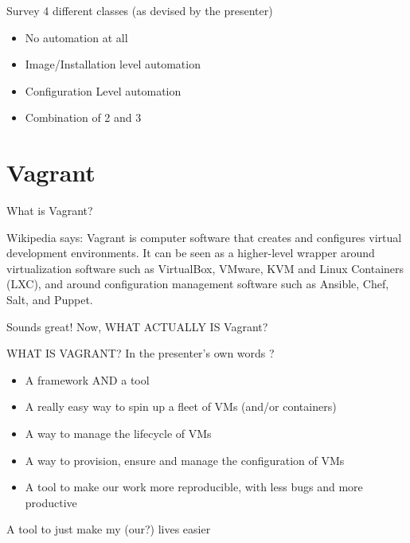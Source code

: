 \documentclass{beamer}
\begin{document}
    \begin{frame}{Survey}
	4 different classes (as devised by the presenter)
        \begin{itemize}
	    \item No automation at all
	    \item Image/Installation level automation
	    \item Configuration Level automation
	    \item Combination of 2 and 3
        \end{itemize}
    \end{frame}

\section{Vagrant}
    \begin{frame}{What is Vagrant?}

    \pause \begin{block}{Wikipedia says:}
		Vagrant is computer software that creates and configures virtual development environments.
		It can be seen as a higher-level wrapper around virtualization software such as VirtualBox,
		VMware, KVM and Linux Containers (LXC), and around configuration management software such as Ansible, Chef, Salt, and Puppet.
    \end{block}

    \pause Sounds great! Now, WHAT ACTUALLY IS Vagrant?
    \end{frame}

    \begin{frame}{WHAT IS VAGRANT?}
	    In the presenter's own words ?
        \begin{itemize}
	    \pause \item A framework AND a tool
	    \pause \item A really easy way to spin up a fleet of VMs (and/or containers)
	    \pause \item A way to manage the lifecycle of VMs
	    \pause \item A way to provision, ensure and manage the configuration of VMs
	    \pause \item A tool to make our work more reproducible, with less bugs and more productive
        \end{itemize}
	A tool to just make my (our?) lives easier
    \end{frame}
\end{document}
